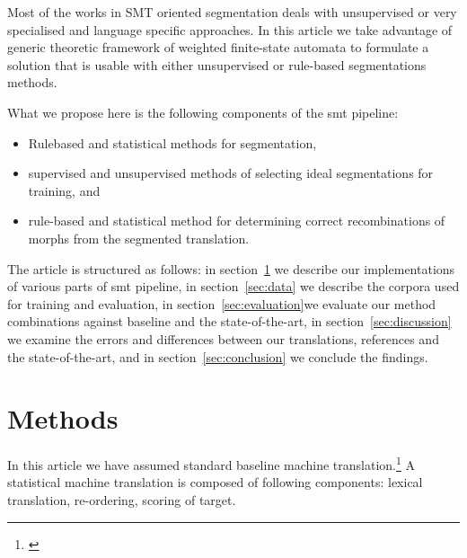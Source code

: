 \documentclass[11pt,letterpaper]{article}
\begin{document}
Most of the works in SMT oriented segmentation deals with unsupervised or very
specialised and language specific approaches. In this article we take advantage
of generic theoretic framework of weighted finite-state automata to formulate
a solution that is usable with either unsupervised or rule-based segmentations
methods.

What we propose here is the following components of the smt pipeline:

\begin{itemize}
    \item Rulebased and statistical methods for segmentation,
    \item supervised and unsupervised methods of selecting ideal segmentations
        for training, and
    \item rule-based and statistical method for determining correct
        recombinations of morphs from the segmented translation.
\end{itemize}

The article is structured as follows: in section~\ref{sec:methods} we describe
our implementations of various parts of smt pipeline, in section~\ref{sec:data}
we describe the corpora used for training and evaluation, in
section~\ref{sec:evaluation}we evaluate our method combinations against
baseline and the state-of-the-art, in section~\ref{sec:discussion} we examine
the errors and differences between our translations, references and the
state-of-the-art, and in section~\ref{sec:conclusion} we conclude the
findings.

\section{Methods}
\label{sec:methods}

In this article we have assumed standard baseline machine 
translation.\footnote{\url{}} 
A statistical machine translation is composed of following components:
lexical translation, re-ordering, scoring of target. 
\end{document}
